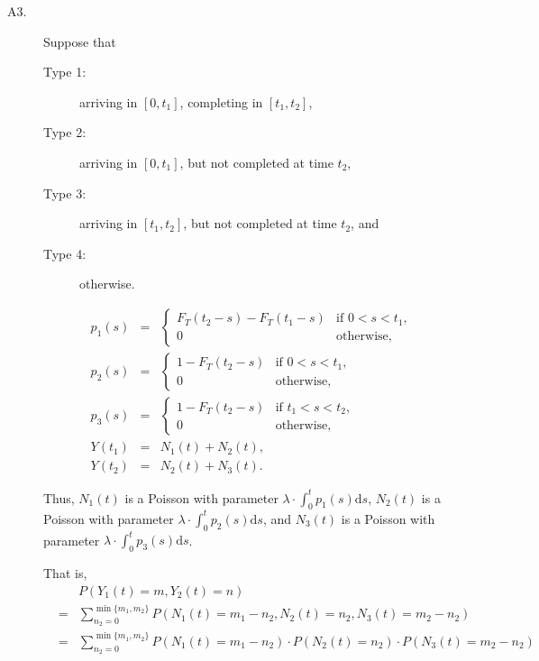 \begin{example}
\begin{description}
\item[A3.] Suppose that
\begin{description}
  \item[Type 1:] arriving in $ [0, t_{1}] $, completing in $ [t_{1}, t_{2}] $,
  \item[Type 2:] arriving in $ [0, t_{1}] $, but not completed at time $ t_{2} $,
  \item[Type 3:] arriving in $ [t_{1}, t_{2}] $, but not completed at time $ t_{2} $, and
  \item[Type 4:] otherwise.
\end{description}
\begin{eqnarray*}
p_{1}(s) & = &
  \begin{cases}
    F_{T}(t_{2} - s) - F_{T}(t_{1} - s) & \text{if } 0 < s < t_{1}, \\
    0                                   & \text{otherwise},
  \end{cases} \\
p_{2}(s) & = &
  \begin{cases}
    1 - F_{T}(t_{2} - s)                & \text{if } 0 < s < t_{1}, \\
    0                                   & \text{otherwise},
  \end{cases} \\
p_{3}(s) & = &
  \begin{cases}
    1 - F_{T}(t_{2} - s)                & \text{if } t_{1} < s < t_{2}, \\
    0                                   & \text{otherwise},
  \end{cases} \\
Y(t_{1}) & = & N_{1}(t) + N_{2}(t), \\
Y(t_{2}) & = & N_{2}(t) + N_{3}(t).
\end{eqnarray*}

Thus, $ N_{1}(t) $ is a Poisson with parameter $ \lambda \cdot \int_{0}^{t} p_{1}(s) \mathrm{d}s $, $ N_{2}(t) $ is a Poisson with parameter $ \lambda \cdot \int_{0}^{t} p_{2}(s) \mathrm{d}s $, and $ N_{3}(t) $ is a Poisson with parameter $ \lambda \cdot \int_{0}^{t} p_{3}(s) \mathrm{d}s $.

That is,
\begin{eqnarray*}
  &   & P(Y_{1}(t) = m, Y_{2}(t) = n) \\
  & = & \sum_{n_{2} = 0}^{\min \{ m_{1}, m_{2} \}} P(N_{1}(t) = m_{1} - n_{2}, N_{2}(t) = n_{2}, N_{3}(t) = m_{2} - n_{2}) \\
  & = & \sum_{n_{2} = 0}^{\min \{ m_{1}, m_{2} \}} P(N_{1}(t) = m_{1} - n_{2}) \cdot P(N_{2}(t) = n_{2}) \cdot P(N_{3}(t) = m_{2} - n_{2}) \\
\end{eqnarray*}
\end{description}
\end{example}

